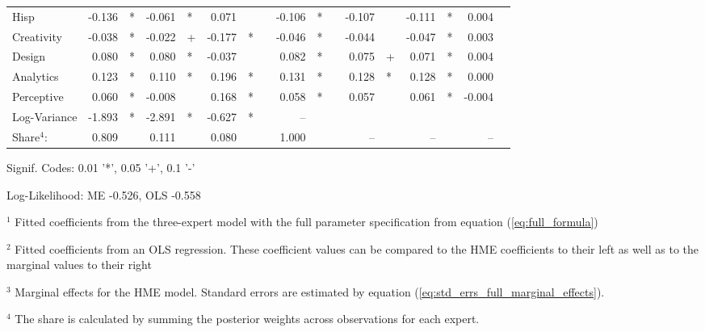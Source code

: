 \documentclass[12pt]{article}
\theoremstyle{definition}
\begin{document}
\begin{landscape}
\begin{table}
\begin{threeparttable}
\begin{tabular}[l]{l r l r l r l c r l c r l r l r l}
Hisp                  & -0.136 & *      & -0.061 & *      &  0.071 &        && -0.106 & *     && -0.107 &          & -0.111 & *        &  0.004 &        \\
Creativity            & -0.038 & *      & -0.022 & +      & -0.177 & *      && -0.046 & *     && -0.044 &          & -0.047 & *        &  0.003 &        \\
Design                &  0.080 & *      &  0.080 & *      & -0.037 &        &&  0.082 & *     &&  0.075 & +        &  0.071 & *        &  0.004 &        \\
Analytics             &  0.123 & *      &  0.110 & *      &  0.196 & *      &&  0.131 & *     &&  0.128 & *        &  0.128 & *        &  0.000 &        \\
Perceptive            &  0.060 & *      & -0.008 &        &  0.168 & *      &&  0.058 & *     &&  0.057 &          &  0.061 & *        & -0.004 &        \\
Log-Variance          & -1.893 & *      & -2.891 & *      & -0.627 & *      &&  --    &       &&  &          &  &          &  &        \\
\cmidrule(l){2-3} \cmidrule(l){4-5} \cmidrule(l){6-7} \cmidrule(l){9-10} \cmidrule(l){12-13} \cmidrule(l){14-15} \cmidrule(l){16-17}
Share$^{4}$:          & 0.809  &        & 0.111  &      & 0.080 &           &&  1.000 &       &&  --    &          &  --    &          &  --    &        \\
\cmidrule{1-17}
      \end{tabular}

      \begin{tablenotes}
        \item Signif. Codes: 0.01 '*', 0.05 '+', 0.1 '-'
        \item Log-Likelihood: ME -0.526, OLS -0.558
        \item $^{1}$ Fitted coefficients from the three-expert model with the full parameter specification from equation (\ref{eq:full_formula})
        \item $^{2}$ Fitted coefficients from an OLS regression. These coefficient values can be compared to the HME coefficients to their left as well as to the marginal values to their right
        \item $^{3}$ Marginal effects for the HME model. Standard errors are estimated by equation (\ref{eq:std_errs_full_marginal_effects}).
        \item $^{4}$ The share is calculated by summing the posterior weights across observations for each expert.

      \end{tablenotes} \label{tbl:3W_full_regressions_results}


    \end{threeparttable}

\end{table}
\end{landscape}
\end{document}

